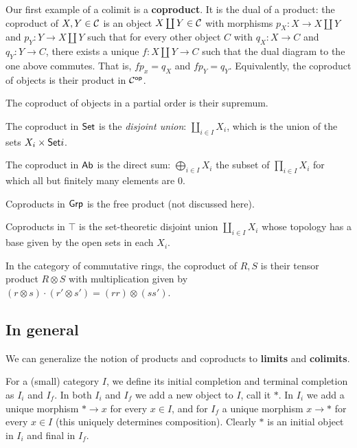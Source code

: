 Our first example of a colimit is a {\bf coproduct}.
It is the dual of a product: the coproduct of $X,Y\in{{\cal C}}$ is an object $X\coprod Y\in{{\cal C}}$ with morphisms $p_X\colon X\to X\coprod Y$ and $p_Y\colon Y\to X\coprod Y$ such that
for every other object $C$ with $q_X\colon X\to C$ and $q_Y\colon Y\to C$, there exists a unique $f\colon X\coprod Y\to C$ such that the dual diagram to the one above commutes.
That is, $fp_x=q_X$ and $fp_Y=q_Y$.
Equivalently, the coproduct of objects is their product in ${{\cal C}}^{\sf op}$.

\benum
    \item The coproduct of objects in a partial order is their supremum.
    \item The coproduct in ${\sf Set}$ is the {\it disjoint union}: $\coprod_{i\in I}X_i$, which is the union of the sets $X_i\times{\sf Set} i$.
    \item The coproduct in ${\sf Ab}$ is the direct sum: $\bigoplus_{i\in I}X_i$ the subset of $\prod_{i\in I}X_i$ for which all but finitely many elements are $0$.
    \item Coproducts in ${\sf Grp}$ is the free product (not discussed here).
    \item Coproducts in $\top$ is the set-theoretic disjoint union $\coprod_{i\in I}X_i$ whose topology has a base given by the open sets in each $X_i$.
    \item In the category of commutative rings, the coproduct of $R,S$ is their tensor product $R\otimes S$ with multiplication given by $(r\otimes s)\cdot(r'\otimes s')=(rr)\otimes(ss')$.
\eenum

\subsection{In general}

We can generalize the notion of products and coproducts to {\bf limits} and {\bf colimits}.

\bdefn

    For a (small) category $I$, we define its {\emphcolor initial completion} and {\emphcolor terminal completion} as $I_i$ and $I_f$.
    In both $I_i$ and $I_f$ we add a new object to $I$, call it $*$.
    In $I_i$ we add a unique morphism $*\to x$ for every $x\in I$, and for $I_f$ a unique morphism $x\to *$ for every $x\in I$ (this uniquely determines composition).
    Clearly $*$ is an initial object in $I_i$ and final in $I_f$.

\edefn

\bdefn


